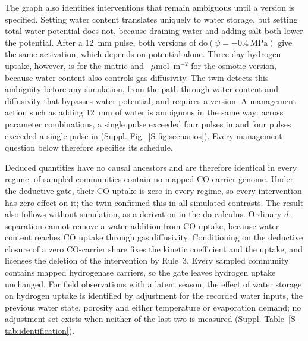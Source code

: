 \documentclass[11pt,a4paper]{article}
\begin{document}
The graph also identifies interventions that remain ambiguous until a version is specified. Setting water content translates uniquely to water storage, but setting total water potential does not, because draining water and adding salt both lower the potential. After a 12~mm pulse, both versions of $\mathrm{do}(\psi=-0.4~\mathrm{MPa})$ give the same activation, which depends on potential alone. Three-day hydrogen uptake, however, is \PsiMildUptakeMatric{} for the matric and \PsiMildUptakeOsmotic{}~$\mu$mol~m$^{-2}$ for the osmotic version, because water content also controls gas diffusivity. The twin detects this ambiguity before any simulation, from the path through water content and diffusivity that bypasses water potential, and requires a version. A management action such as adding 12~mm of water is ambiguous in the same way: across \VersionMembers{} parameter combinations, a single pulse exceeded four pulses in \VersionSingleFirst{} and four pulses exceeded a single pulse in \VersionFourFirst{} (Suppl. Fig.~\ref{S-fig:scenarios}). Every management question below therefore specifies its schedule.

Deduced quantities have no causal ancestors and are therefore identical in every regime. \ClosedCOGates{} of \MappedSamples{} sampled communities contain no mapped CO-carrier genome. Under the deductive gate, their CO uptake is zero in every regime, so every intervention has zero effect on it; the twin confirmed this in all \ClosedCOZeroEffects{} simulated contrasts. The result also follows without simulation, as a derivation in the $\mathrm{do}$-calculus. Ordinary $d$-separation cannot remove a water addition from CO uptake, because water content reaches CO uptake through gas diffusivity. Conditioning on the deductive closure of a zero CO-carrier share fixes the kinetic coefficient and the uptake, and licenses the deletion of the intervention by Rule~3. Every sampled community contains mapped hydrogenase carriers, so the gate leaves hydrogen uptake unchanged. For field observations with a latent season, the effect of water storage on hydrogen uptake is identified by adjustment for the recorded water inputs, the previous water state, porosity and either temperature or evaporation demand; no adjustment set exists when neither of the last two is measured (Suppl. Table~\ref{S-tab:identification}).
\end{document}
